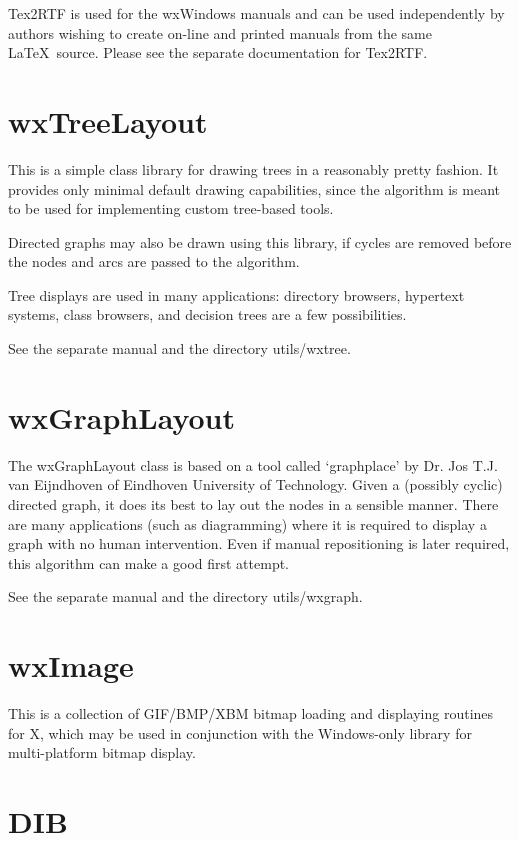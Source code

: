 Tex2RTF is used for the wxWindows manuals and can be used independently
by authors wishing to create on-line and printed manuals from the same\rtfsp
\LaTeX\ source.  Please see the separate documentation for Tex2RTF.

\section{wxTreeLayout}

This is a simple class library for drawing trees in a reasonably pretty
fashion. It provides only minimal default drawing capabilities, since
the algorithm is meant to be used for implementing custom tree-based
tools.

Directed graphs may also be drawn using this library, if cycles are
removed before the nodes and arcs are passed to the algorithm.

Tree displays are used in many applications: directory browsers,
hypertext systems, class browsers, and decision trees are a few
possibilities.

See the separate manual and the directory utils/wxtree.

\section{wxGraphLayout}

The wxGraphLayout class is based on a tool called `graphplace' by Dr.
Jos T.J. van Eijndhoven of Eindhoven University of Technology. Given a
(possibly cyclic) directed graph, it does its best to lay out the nodes
in a sensible manner. There are many applications (such as diagramming)
where it is required to display a graph with no human intervention. Even
if manual repositioning is later required, this algorithm can make a good
first attempt.

See the separate manual and the directory utils/wxgraph. 

\section{wxImage}\label{wximage}

This is a collection of GIF/BMP/XBM bitmap loading and displaying
routines for X, which may be used in conjunction with the
Windows-only  library for multi-platform bitmap display.

\section{DIB}\label{dib}

